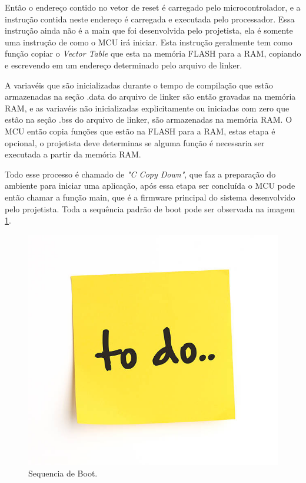 Então o endereço contido no vetor de reset é carregado pelo microcontrolador, e a instrução contida neste endereço é carregada e executada pelo processador. Essa instrução ainda não é a main que foi desenvolvida pelo projetista, ela é somente uma instrução de como o MCU irá iniciar. Esta instrução geralmente tem como função copiar o \textit{Vector Table} que esta na memória FLASH para a RAM, copiando e escrevendo em um endereço determinado pelo arquivo de linker.

A variavéis que são inicializadas durante o tempo de compilação que estão armazenadas na seção .data do arquivo de linker são então gravadas na memória RAM, e as variavéis não inicializadas explicitamente ou iniciadas com zero que estão na seção .bss do arquivo de linker, são armazenadas na memória RAM. O MCU então copia funções que estão na FLASH para a RAM, estas etapa é opcional, o projetista deve determinas se alguma função é necessaria ser executada a partir da memória RAM. 

Todo esse processo é chamado de \textit{"C Copy Down"}, que faz a preparação do ambiente para iniciar uma aplicação, após essa etapa ser concluída o MCU pode então chamar a função main, que é a firmware principal do sistema desenvolvido pelo projetista. Toda a sequência padrão de boot pode ser observada na imagem \ref{Seq_Boot}.

\begin{figure}[H]
    \scriptsize
     \centering
     \includegraphics[scale=1]{dados/figuras/ToDo.jpg}
     \caption{Sequencia de Boot.}
     \label{Seq_Boot}
\end{figure}

